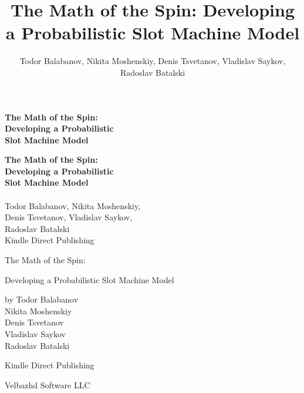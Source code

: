 \documentclass[12pt,twoside,openany]{book}
\title{The Math of the Spin: Developing a Probabilistic Slot Machine Model}
\author{Todor Balabanov, Nikita Moshenskiy, Denis Tsvetanov, Vladislav Saykov, Radoslav Batalski}
\begin{document}
\sloppy

\frontmatter

\thispagestyle{empty}
\begin{center} \vspace*{2in} \Large\textbf{The Math of the Spin:\\ Developing a Probabilistic\\ Slot Machine Model}\\ \vspace*{0.25in} \Large\textit{} \end{center}
\clearpage

\thispagestyle{empty}
\begin{center}
    \vspace*{1in}
    \Large\textbf{The Math of the Spin:\\ Developing a Probabilistic\\ Slot Machine Model} \\
    \vspace*{0.25in} \Large\textit{} \\
    \vfill
    \large Todor Balabanov, Nikita Moshenskiy,\\ Denis Tsvetanov, Vladislav Saykov,\\ Radoslav Batalski \\
    \vspace*{0.25in} \small Kindle Direct Publishing
\end{center}
\clearpage

\thispagestyle{empty}
\vspace*{0.5in}
The Math of the Spin:

Developing a Probabilistic Slot Machine Model

\vspace*{0.1in}
by \hspace*{0.5in} Todor Balabanov\\ 
\hspace*{0.95in} Nikita Moshenskiy\\ 
\hspace*{0.95in} Denis Tsvetanov\\ 
\hspace*{0.95in} Vladislav Saykov\\ 
\hspace*{0.95in} Radoslav Batalski

\vspace*{0.25in}
Kindle Direct Publishing

\vspace*{0.25in}
Velbazhd Software LLC
\end{document}
